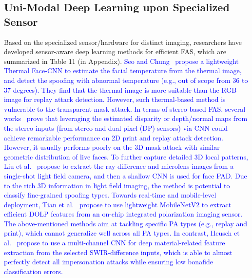 \documentclass[10pt,journal,compsoc]{IEEEtran}
\begin{document}
\subsection{Uni-Modal Deep Learning upon Specialized Sensor}
Based on the specialized sensor/hardware for distinct imaging, researchers have developed sensor-aware deep learning methods for efficient FAS, which are summarized in Table 11 (in Appendix). \textcolor{blue}{Seo and Chung~\cite{seo2019face} propose a lightweight Thermal Face-CNN to estimate the facial temperature from the thermal image, and detect the spoofing with abnormal temperature (e.g., out of scope from 36 to 37 degrees). They find that the thermal image is more suitable than the RGB image for replay attack detection. However, such thermal-based method is vulnerable to the transparent mask attack. In terms of stereo-based FAS, several works~\cite{rehman2020slnet,kang2021facial,wu2020single} prove that leveraging the estimated disparity or depth/normal maps from the stereo inputs (from stereo and dual pixel (DP) sensors) via CNN could achieve remarkable performance on 2D print and replay attack detection. However, it usually performs poorly on the 3D mask attack with similar geometric distribution of live faces. To further capture detailed 3D local patterns, Liu et al.~\cite{liu2019light} propose to extract the ray difference and microlens images from a single-shot light field camera, and then a shallow CNN is used for face PAD. Due to the rich 3D information in light field imaging, the method is potential to classify fine-grained spoofing types. Towards real-time and mobile-level deployment, Tian et al.~\cite{tian2020face} propose to use lightweight MobileNetV2 to extract efficient DOLP features from an on-chip integrated polarization imaging sensor. The above-mentioned methods aim at tackling specific PA types (e.g., replay and print), which cannot generalize well across all PA types. In contrast, Heusch et al.~\cite{heusch2020deep} propose to use a multi-channel CNN for deep material-related feature extraction from the selected SWIR-difference inputs, which is able to almost perfectly detect all impersonation attacks while ensuring low bonafide classification errors.}
\end{document}
